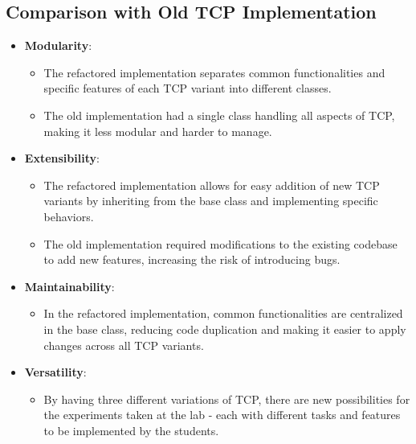 \subsection{Comparison with Old TCP Implementation}
\begin{itemize}
    \vspace{0.5cm}
    \item \textbf{Modularity}:
    \begin{itemize}
        \item The refactored implementation separates common functionalities and specific features of each TCP variant into different classes.
        \item The old implementation had a single class handling all aspects of TCP, making it less modular and harder to manage.
    \end{itemize}
    \vspace{0.3cm}
    \item \textbf{Extensibility}:
    \begin{itemize}
        \item The refactored implementation allows for easy addition of new TCP variants by inheriting from the base class and implementing specific behaviors.
        \item The old implementation required modifications to the existing codebase to add new features, increasing the risk of introducing bugs.
    \end{itemize}
    \vspace{0.3cm}
    \item \textbf{Maintainability}:
    \begin{itemize}
        \item In the refactored implementation, common functionalities are centralized in the base class, reducing code duplication and making it easier to apply changes across all TCP variants.
    \end{itemize}
    \vspace{0.3cm}
    \item \textbf{Versatility}:
    \begin{itemize}
        \item By having three different variations of TCP, there are new possibilities for the experiments taken at the lab - each with different tasks and features to be implemented by the students.
    \end{itemize}
\end{itemize}

\newpage

